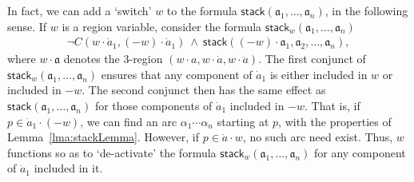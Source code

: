 \documentclass{article}
\newcommand{\tseq}[1]{\mathfrak{#1}}
\newcommand{\intermediate}[1]{\dot{#1}}
\newcommand{\inner}[1]{\ddot{#1}}
\newcommand{\stack}{\mathsf{stack}}
\begin{document}
In fact, we can add a `switch' $w$ to the formula $\stack(\tseq{a}_1,
\ldots, \tseq{a}_n)$, in the following sense.  If $w$ is a region
variable, consider the formula $\stack_w(\tseq{a}_1, \ldots, \tseq{a}_n)$
\begin{align*}
\neg C(w\cdot \intermediate{a}_1, (-w) \cdot \intermediate{a}_1) \ \wedge \ \stack((-w)\cdot \tseq{a}_1, \tseq{a}_2, \ldots, \tseq{a}_n),
\end{align*}
where $w \cdot \tseq{a}$ denotes the 3-region $(w\cdot a,w\cdot
\intermediate{a},w\cdot \inner{a})$. The first conjunct of
$\stack_w(\tseq{a}_1, \ldots, \tseq{a}_n)$ ensures that any component
of $\intermediate{a}_1$ is either included in $w$ or included in
$-w$. The second conjunct then has the same effect as
$\stack(\tseq{a}_1, \ldots, \tseq{a}_n)$ for those components of
$\intermediate{a}_1$ included in $-w$. That is, if $p \in
\intermediate{a}_1 \cdot (-w)$, we can find an arc $\alpha_1 \cdots
\alpha_n$ starting at $p$, with the properties of
Lemma~\ref{lma:stackLemma}.  However, if $p \in \intermediate{a} \cdot
w$, no such arc need exist.  Thus, $w$ functions so as to
`de-activate' the formula $\stack_w(\tseq{a}_1, \ldots, \tseq{a}_n)$
for any component of $\intermediate{a}_1$ included in it.
\end{document}

